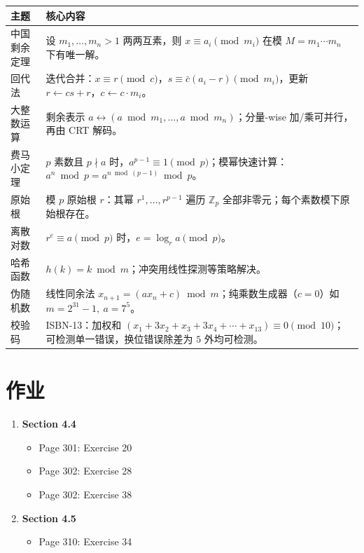 \documentclass[UTF8,11pt,a4paper]{ctexbook}   %
\theoremstyle{definition}
\begin{document}
\begin{table}[htbp]
\centering
\small
\setlength{\tabcolsep}{4pt}
\begin{tabular}{|p{2.6cm}|p{11.2cm}|}
\hline
\textbf{主题} & \textbf{核心内容} \\
\hline
中国剩余定理 & 设 $m_1,\ldots,m_n>1$ 两两互素，则 $x\equiv a_i\pmod{m_i}$ 在模 $M=m_1\cdots m_n$ 下有唯一解。 \\
\hline
回代法 & 迭代合并：$x\equiv r\pmod c$，$s\equiv\bar c(a_i-r)\pmod{m_i}$，更新 $r\leftarrow cs+r$，$c\leftarrow c\cdot m_i$。 \\
\hline
大整数运算 & 剩余表示 $a\leftrightarrow(a\bmod m_1,\ldots,a\bmod m_n)$；分量-wise 加/乘可并行，再由 CRT 解码。 \\
\hline
费马小定理 & $p$ 素数且 $p\nmid a$ 时，$a^{p-1}\equiv 1\pmod p$；模幂快速计算：$a^n\bmod p=a^{n\bmod(p-1)}\bmod p$。 \\
\hline
原始根 & 模 $p$ 原始根 $r$：其幂 $r^1,\ldots,r^{p-1}$ 遍历 $\mathbb{Z}_p$ 全部非零元；每个素数模下原始根存在。 \\
\hline
离散对数 & $r^e\equiv a\pmod p$ 时，$e=\log_r a\pmod p$。 \\
\hline
哈希函数 & $h(k)=k\bmod m$；冲突用线性探测等策略解决。 \\
\hline
伪随机数 & 线性同余法 $x_{n+1}=(ax_n+c)\bmod m$；纯乘数生成器（$c=0$）如 $m=2^{31}-1,\ a=7^5$。 \\
\hline
校验码 & ISBN-13：加权和 $(x_1+3x_2+x_3+3x_4+\cdots+x_{13})\equiv 0\pmod{10}$；可检测单一错误，换位错误除差为 $5$ 外均可检测。 \\
\hline
\end{tabular}
\end{table}

\section{作业}

\begin{enumerate}
    \item \textbf{Section 4.4}
    \begin{itemize}
        \item Page 301: Exercise 20
        \item Page 302: Exercise 28
        \item Page 302: Exercise 38
    \end{itemize}
    \item \textbf{Section 4.5}
    \begin{itemize}
        \item Page 310: Exercise 34
    \end{itemize}
\end{enumerate}
\end{document}
